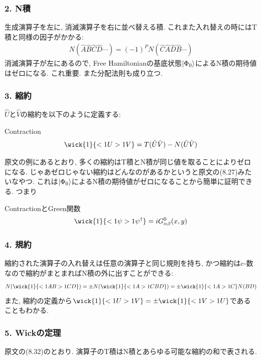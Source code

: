\documentclass[10.5pt,a4paper]{jreport}
\begin{document}
\subsubsection{2. N積}
生成演算子を左に, 消滅演算子を右に並べ替える積. これまた入れ替えの時にはT積と同様の因子がかかる:
\begin{eqnarray}
  N(\hat{A}\hat{B}\hat{C}\hat{D}\cdots) = (-1)^PN(\hat{C}\hat{A}\hat{D}\hat{B}\cdots)
\end{eqnarray}
消滅演算子が左にあるので, Free Hamiltonianの基底状態$\ket{\Phi_0}$によるN積の期待値はゼロになる. これ重要. また分配法則も成り立つ. 

\subsubsection{3. 縮約}
$\hat{U}$と$\hat{V}$の縮約を以下のように定義する:
\begin{itembox}[c]{Contraction}
  \begin{eqnarray}
    \wick{1}{<1U >1V} = T(\hat{U}\hat{V}) - N(\hat{U}\hat{V})\label{wick3}
  \end{eqnarray}
\end{itembox}
原文の例にあるとおり, 多くの縮約はT積とN積が同じ値を取ることによりゼロになる. じゃあゼロじゃない縮約はどんなのがあるかというと原文の(8.27)みたいなやつ. これは$\ket{\Phi_0}$によるN積の期待値がゼロになることから簡単に証明できる. つまり
\begin{itembox}[c]{ContractionとGreen関数}
  \begin{eqnarray}
    \wick{1}{<1\psi >1\psi^\dagger} = iG^0_{\alpha\beta}(x, y)\label{wick4}
\end{eqnarray}
\end{itembox}

\subsubsection{4. 規約}
縮約された演算子の入れ替えは任意の演算子と同じ規則を持ち, かつ縮約はc-数なので縮約がまとまればN積の外に出すことができる:
\begin{eqnarray}
  N(\wick{1}{<1A B >1C D}) = \pm N(\wick{1}{<1A >1C B D}) = \pm \wick{1}{<1A >1C}N(BD)
\end{eqnarray}
また, 縮約の定義から$\wick{1}{<1U >1V} = \pm \wick{1}{<1V >1U}$であることもわかる. 

\subsubsection{5. Wickの定理}
原文の(8.32)のとおり. 演算子のT積はN積とあらゆる可能な縮約の和で表される.
\end{document}
